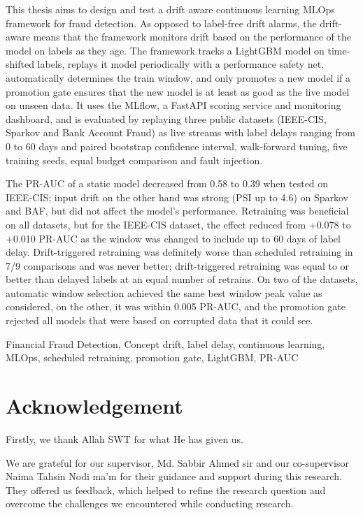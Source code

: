 \documentclass[11pt,letterpaper]{report}
\begin{document}
This thesis aims to design and test a drift aware continuous learning MLOps framework for fraud detection. As opposed to label-free drift alarms, the drift-aware means that the framework monitors drift based on the performance of the model on labels as they age. The framework tracks a LightGBM model on time-shifted labels, replays it model periodically with a performance safety net, automatically determines the train window, and only promotes a new model if a promotion gate ensures that the new model is at least as good as the live model on unseen data. It uses the MLflow, a FastAPI scoring service and monitoring dashboard, and is evaluated by replaying three public datasets (IEEE-CIS, Sparkov and Bank Account Fraud) as live streams with label delays ranging from 0 to 60 days and paired bootstrap confidence interval, walk-forward tuning, five training seeds, equal budget comparison and fault injection.

The PR-AUC of a static model decreased from 0.58 to 0.39 when tested on IEEE-CIS; input drift on the other hand was strong (PSI up to 4.6) on Sparkov and BAF, but did not affect the model's performance. Retraining was beneficial on all datasets, but for the IEEE-CIS dataset, the effect reduced from +0.078 to +0.010 PR-AUC as the window was changed to include up to 60 days of label delay. Drift-triggered retraining was definitely worse than scheduled retraining in 7/9 comparisons and was never better; drift-triggered retraining was equal to or better than delayed labels at an equal number of retrains. On two of the datasets, automatic window selection achieved the same best window peak value as considered, on the other, it was within 0.005 PR-AUC, and the promotion gate rejected all models that were based on corrupted data that it could see.

Financial Fraud Detection, Concept drift, label delay, continuous learning, MLOps, scheduled retraining, promotion gate, LightGBM, PR-AUC

\chapter*{Acknowledgement}

Firstly, we thank Allah SWT for what He has given us.

We are grateful for our supervisor, Md. Sabbir Ahmed sir and our co-supervisor Naima Tahsin Nodi ma'm for their guidance and support during this research. They offered us feedback, which helped to refine the research question and overcome the challenges we encountered while conducting research.
\end{document}
